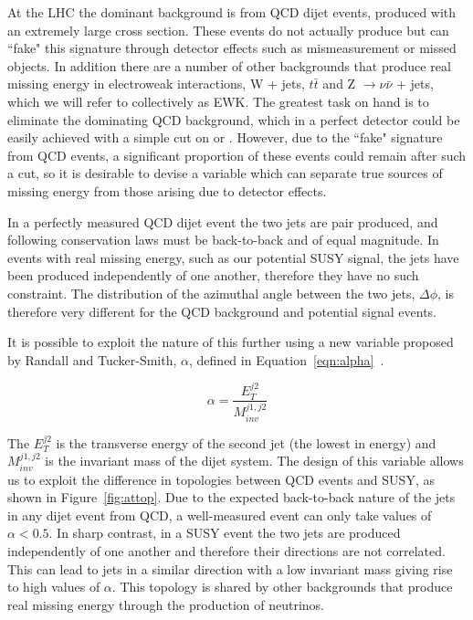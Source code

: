 At the LHC the dominant background is from QCD dijet events, produced with an extremely large cross section. These events do not actually produce \met but can ``fake" this signature through detector effects such as mismeasurement or missed objects. In addition there are a number of other backgrounds that produce real missing energy in electroweak interactions, W + jets, $t \bar{t}$ and Z $\rightarrow \nu \bar{\nu}$ + jets, which we will refer to collectively as EWK. The greatest task on hand is to eliminate the dominating QCD background, which in a perfect detector could be easily achieved with a simple cut on \met or \mht. However, due to the ``fake" \met signature from QCD events, a significant proportion of these events could remain after such a cut, so it is desirable to devise a variable which can separate true sources of missing energy from those arising due to detector effects. 

In a perfectly measured QCD dijet event the two jets are pair produced, and following conservation laws must be back-to-back and of equal magnitude. In events with real missing energy, such as our potential SUSY signal, the jets have been produced independently of one another, therefore they have no such constraint. The distribution of the azimuthal angle between the two jets, $\Delta \phi$, is therefore very different for the QCD background and potential signal events.  


It is possible to exploit the nature of this further using a new variable proposed by Randall and Tucker-Smith, $\alpha$, defined in Equation~\ref{eqn:alpha}~\cite{Randall}. 

\begin{equation}
\alpha = \frac{E_{T}^{j2}}{M_{inv}^{j1,j2}}
\label{eqn:alpha}
\end{equation}

The $E_{T}^{j2}$ is the transverse energy of the second jet (the lowest in energy) and $M_{inv}^{j1,j2}$ is the invariant mass of the dijet system. The design of this variable allows us to exploit the difference in topologies between QCD events and SUSY, as shown in Figure~\ref{fig:attop}. Due to the expected back-to-back nature of the jets in any dijet event from QCD, a well-measured event can only take values of $\alpha < 0.5$. In sharp contrast, in a SUSY event the two jets are produced independently of one another and therefore their directions are not correlated. This can lead to jets in a similar direction with a low invariant mass giving rise to high values of $\alpha$. This topology is shared by other backgrounds that produce real missing energy through the production of neutrinos.


